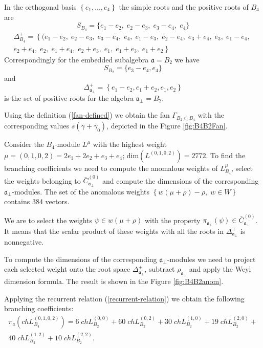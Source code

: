 \documentclass[12pt]{iopart}
\theoremstyle{definition}
\newcommand{\af}{\mathfrak{a}}
\newcommand{\afb}{\mathfrak{a}_{\bot}}
\begin{document}
In the orthogonal basis $\left\{e_1,\dots,e_4\right\}$ the simple roots and the positive roots of $B_4$ are
\begin{equation*}
  \label{eq:8}
 S_{B_4}= \{e_1 - e_2,\; e_2 - e_3,\; e_3 - e_4,\; e_4\}
\end{equation*}
\begin{eqnarray*}
  \label{eq:19}
 \Delta^+_{B_4}=\left\{ (e_1 - e_2,\; e_2 - e_3,\; e_3 - e_4,\; e_4,\; e_1 - e_3,\; e_2 - e_4,\; e_3 + e_4,\; e_3,\; e_1 - e_4,\;\right.\\
 \left. e_2 + e_4,\; e_2,\; e_1 + e_4,\; e_2 + e_3,\; e_1,\; e_1 + e_3,\; e_1 + e_2\right\}
\end{eqnarray*}
Correspondingly for the embedded subalgebra $\af=B_2$ we have
\begin{equation*}
  \label{eq:26}
 S_{B_2}=\{e_3-e_4,e_4\}
\end{equation*}
and
\begin{equation*}
  \label{eq:27}
 \Delta^{+}_{\afb}= \left\{e_1-e_2,e_1+e_2,e_1,e_2\right\}
\end{equation*}
is the set of positive roots for the algebra $\afb=B_2$.

Using the definition (\ref{fan-defined}) we obtain the fan
$\Gamma_{B_2\subset B_4}$ with the corresponding values $s(\gamma+\gamma_0)$,
depicted in the Figure \ref{fig:B4B2Fan}.


Consider the $B_4$-module $L^{\mu}$ with the highest weight $\mu=(0,1,0,2)=2
e_1 + 2 e_2 + e_3 + e_4$; $\mathrm{dim}(L^{(0,1,0,2)})=2772$.
To find the branching coefficients we need to compute the anomalous weights of
$L^{\mu}_{B_4}$, select the weights belonging to $\bar{C}^{\left( 0 \right)}_{\afb}$
and compute the dimensions of the corresponding $\afb$-modules.
The set of the anomalous weights $\left\{ w(\mu+\rho)-\rho,\; w\in W\right\}$
contains 384 vectors.

We are to select the weights $\psi \in w(\mu+\rho)$  with the property
$\pi_{\afb} \left(  \psi \right) \in \bar{C}^{\left( 0 \right)}_{\afb}$.
It means that the scalar product of these weights with all the roots in $\Delta^{+}_{\afb}$ is nonnegative.

To compute the dimensions of the corresponding
$\afb$-modules we need to project each selected weight
onto the root space $\Delta^{+}_{\afb}$, subtract
$\rho_{\afb}$ and apply the Weyl dimension formula. The result is shown in the Figure \ref{fig:B4B2anom}.

Applying the recurrent relation (\ref{recurrent-relation}) we obtain the
following branching coefficients:
\begin{eqnarray*}
  \label{eq:24}
  \pi_{\af} \left(ch L^{(0,1,0,2)}_{B_4}\right) = 6 \; ch L^{(0,0)}_{B_2}+ 60
  \; ch L_{B_2}^{(0,2)}+ 30 \; ch L_{B_2}^{(1,0)}+ 19 \; ch L_{B_2}^{(2,0)}+\\
  40 \; ch L_{B_2}^{(1,2)}+ 10 \; ch L_{B_2}^{(2,2)}.
\end{eqnarray*}
\end{document}

